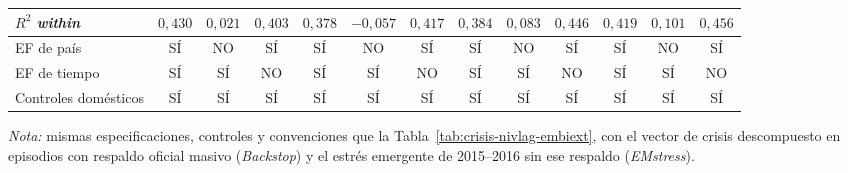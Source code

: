 \documentclass[11pt]{article}
\begin{document}
\begin{landscape}
\begin{table}
\begin{adjustbox}{max width=\linewidth, max totalheight=\tablaalto\textheight}
\begin{tabular}{l c ccc ccc ccc cc}
$R^2$ \textit{within} & $0{,}430$ & $0{,}021$ & $0{,}403$ & $0{,}378$ & $-0{,}057$ & $0{,}417$ & $0{,}384$ & $0{,}083$ & $0{,}446$ & $0{,}419$ & $0{,}101$ & $0{,}456$ \\
\midrule
EF de país & SÍ & NO & SÍ & SÍ & NO & SÍ & SÍ & NO & SÍ & SÍ & NO & SÍ \\
EF de tiempo & SÍ & SÍ & NO & SÍ & SÍ & NO & SÍ & SÍ & NO & SÍ & SÍ & NO \\
Controles domésticos & SÍ & SÍ & SÍ & SÍ & SÍ & SÍ & SÍ & SÍ & SÍ & SÍ & SÍ & SÍ \\
\bottomrule
\end{tabular}
\end{adjustbox}
\par\smallskip\parbox{\linewidth}{\scriptsize \textit{Nota:} mismas especificaciones, controles y convenciones que la Tabla~\ref{tab:crisis-nivlag-embiext}, con el vector de crisis descompuesto en episodios con respaldo oficial masivo (\textit{Backstop}) y el estrés emergente de 2015--2016 sin ese respaldo (\textit{EMstress}).}
\end{table}
\end{landscape}
\end{document}

